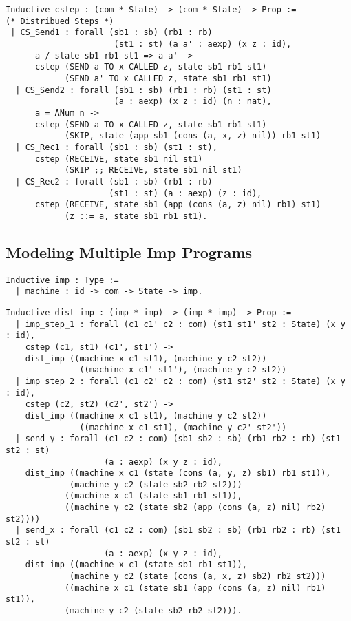 \documentclass{llncs}
\begin{document}
\begin{lstlisting}
Inductive cstep : (com * State) -> (com * State) -> Prop :=
(* Distribued Steps *)
 | CS_Send1 : forall (sb1 : sb) (rb1 : rb)
                      (st1 : st) (a a' : aexp) (x z : id),
      a / state sb1 rb1 st1 => a a' -> 
      cstep (SEND a TO x CALLED z, state sb1 rb1 st1) 
            (SEND a' TO x CALLED z, state sb1 rb1 st1)
  | CS_Send2 : forall (sb1 : sb) (rb1 : rb) (st1 : st) 
                      (a : aexp) (x z : id) (n : nat),
      a = ANum n ->
      cstep (SEND a TO x CALLED z, state sb1 rb1 st1) 
            (SKIP, state (app sb1 (cons (a, x, z) nil)) rb1 st1)
  | CS_Rec1 : forall (sb1 : sb) (st1 : st),
      cstep (RECEIVE, state sb1 nil st1) 
            (SKIP ;; RECEIVE, state sb1 nil st1)
  | CS_Rec2 : forall (sb1 : sb) (rb1 : rb) 
                     (st1 : st) (a : aexp) (z : id),
      cstep (RECEIVE, state sb1 (app (cons (a, z) nil) rb1) st1) 
            (z ::= a, state sb1 rb1 st1).
\end{lstlisting}

\subsection{Modeling Multiple Imp Programs}

\begin{lstlisting}
Inductive imp : Type :=
  | machine : id -> com -> State -> imp.
\end{lstlisting}

\begin{lstlisting}
Inductive dist_imp : (imp * imp) -> (imp * imp) -> Prop :=
  | imp_step_1 : forall (c1 c1' c2 : com) (st1 st1' st2 : State) (x y : id),
    cstep (c1, st1) (c1', st1') ->
    dist_imp ((machine x c1 st1), (machine y c2 st2))
               ((machine x c1' st1'), (machine y c2 st2))
  | imp_step_2 : forall (c1 c2' c2 : com) (st1 st2' st2 : State) (x y : id),
    cstep (c2, st2) (c2', st2') ->
    dist_imp ((machine x c1 st1), (machine y c2 st2))
               ((machine x c1 st1), (machine y c2' st2'))
  | send_y : forall (c1 c2 : com) (sb1 sb2 : sb) (rb1 rb2 : rb) (st1 st2 : st)
                    (a : aexp) (x y z : id),
    dist_imp ((machine x c1 (state (cons (a, y, z) sb1) rb1 st1)),
             (machine y c2 (state sb2 rb2 st2)))
            ((machine x c1 (state sb1 rb1 st1)),
            ((machine y c2 (state sb2 (app (cons (a, z) nil) rb2) st2))))
  | send_x : forall (c1 c2 : com) (sb1 sb2 : sb) (rb1 rb2 : rb) (st1 st2 : st)
                    (a : aexp) (x y z : id),
    dist_imp ((machine x c1 (state sb1 rb1 st1)),
             (machine y c2 (state (cons (a, x, z) sb2) rb2 st2))) 
            ((machine x c1 (state sb1 (app (cons (a, z) nil) rb1) st1)),
            (machine y c2 (state sb2 rb2 st2))).
\end{lstlisting}
\end{document}
